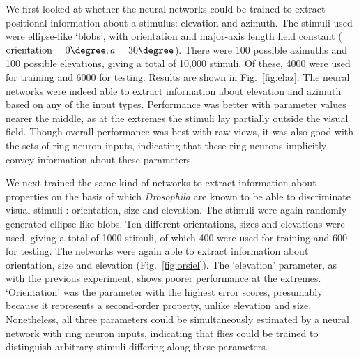 We first looked at whether the neural networks could be trained to extract positional information about a stimulus: elevation and azimuth.
The stimuli used were ellipse-like `blobs', with orientation and major-axis length held constant ($\mathrm{orientation} = 0\degree, a = 30\degree$).
There were 100 possible azimuths and 100 possible elevations, giving a total of 10,000 stimuli.
Of these, 4000 were used for training and 6000 for testing.
Results are shown in Fig.~\ref{fig:elaz}.
The neural networks were indeed able to extract information about elevation and azimuth based on any of the input types.
Performance was better with parameter values nearer the middle, as at the extremes the stimuli lay partially outside the visual field.
Though overall performance was best with raw views, it was also good with the sets of ring neuron inputs, indicating that these ring neurons implicitly convey information about these parameters.

We next trained the same kind of networks to extract information about properties on the basis of which \emph{Drosophila} are known to be able to discriminate visual stimuli \cite{Pan2009,Liu2006,Ernst1999}: orientation, size and elevation.
The stimuli were again randomly generated ellipse-like blobs.
Ten different orientations, sizes and elevations were used, giving a total of 1000 stimuli, of which 400 were used for training and 600 for testing.
The networks were again able to extract information about orientation, size and elevation (Fig.~\ref{fig:orsiel}).
The `elevation' parameter, as with the previous experiment, shows poorer performance at the extremes.
`Orientation' was the parameter with the highest error scores, presumably because it represents a second-order property, unlike elevation and size.
Nonetheless, all three parameters could be simultaneously estimated by a neural network with ring neuron inputs, indicating that flies could be trained to distinguish arbitrary stimuli differing along these parameters.

